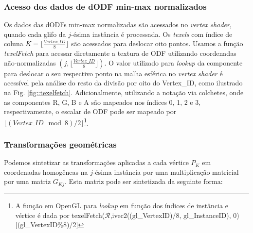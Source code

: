 \subsubsection{Acesso dos dados de dODF min-max normalizados}
Os dados das dODFs min-max normalizadas são acessados no \textit{vertex shader}, quando cada glifo da $j$-ésima instância é processada. Os \textit{texels} com índice de coluna $K = \lfloor\frac{Vertex\_ID}{8} \rfloor$ são acessados para deslocar oito pontos. Usamos a função \textit{texelFetch} para acessar diretamente a textura de ODF utilizando coordenadas não-normalizadas $(j, \lfloor\frac{Vertex\_ID}{8} \rfloor)$. O valor utilizado para \textit{lookup} da componente  para deslocar o seu respectivo ponto na malha esférica no \textit{vertex shader} é acessível pela análise do resto da divisão por oito do Vertex\_ID, como ilustrado na Fig. \ref{fig::texelfetch}. Adicionalmente, utilizando a notação via colchetes, onde as componentes R, G, B e A são mapeados nos índices 0, 1, 2 e 3, respectivamente, o escalar de ODF pode ser mapeado por $\lfloor (Vertex\_ID \mod{8})/2 \rfloor$\footnote{A função em OpenGL para \textit{lookup} em função dos índices de instância e vértice é dada por texelFetch($\boldsymbol{\mathscr{R}}$,ivec2((gl\_VertexID)/8, gl\_InstanceID), 0)[(gl\_VertexID\%8)/2]}.


\subsubsection{Transformações geométricas}

Podemos sintetizar as transformações aplicadas a cada vértice $P_K$ em coordenadas homogêneas na $j$-ésima instância por uma multiplicação matricial por uma matriz $G_{Kj}$. Esta matriz pode ser sintetizada da seguinte forma:

